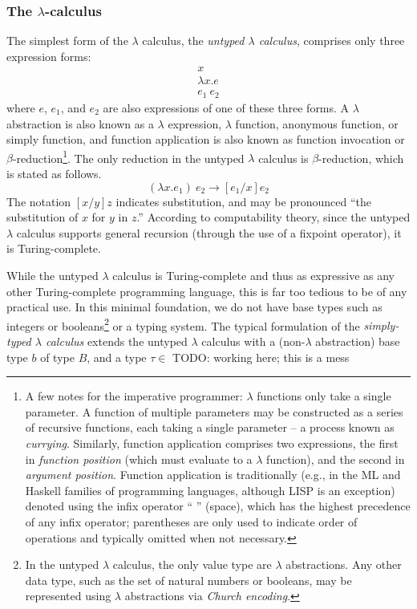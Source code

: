 
\subsubsection{The $\lambda$-calculus}
\label{sec:lambda-calculus}


The simplest form of the $\lambda$ calculus, the \textit{untyped $\lambda$ calculus}, comprises only three expression forms:
\begin{align}
  \label{eq:untyped-lambda-calculus}
  x\tag{Variable} \\
  \lambda x.e\tag{$\lambda$ abstraction} \\
  e_1\ e_2\tag{Function application}
\end{align}
where $e$, $e_1$, and $e_2$ are also expressions of one of these three forms. A $\lambda$ abstraction is also known as a $\lambda$ expression, $\lambda$ function, anonymous function, or simply function, and function application is also known as function invocation or $\beta$-reduction\footnote{A few notes for the imperative programmer: $\lambda$ functions only take a single parameter. A function of multiple parameters may be constructed as a series of recursive functions, each taking a single parameter -- a process known as \textit{currying}. Similarly, function application comprises two expressions, the first in \textit{function position} (which must evaluate to a $\lambda$ function), and the second in \textit{argument position}. Function application is traditionally (e.g., in the ML and Haskell families of programming languages, although LISP is an exception) denoted using the infix operator `` '' (space), which has the highest precedence of any infix operator; parentheses are only used to indicate order of operations and typically omitted when not necessary.}. The only reduction in the untyped $\lambda$ calculus is $\beta$-reduction, which is stated as follows.\[(\lambda x.e_1)\ e_2\to [e_1/x]e_2\] The notation $[x/y]z$ indicates substitution, and may be pronounced ``the substitution of $x$ for $y$ in $z$.'' According to computability theory, since the untyped $\lambda$ calculus supports general recursion (through the use of a fixpoint operator), it is Turing-complete.

While the untyped $\lambda$ calculus is Turing-complete and thus as expressive as any other Turing-complete programming language, this is far too tedious to be of any practical use. In this minimal foundation, we do not have base types such as integers or booleans\footnote{In the untyped $\lambda$ calculus, the only value type are $\lambda$ abstractions. Any other data type, such as the set of natural numbers or booleans, may be represented using $\lambda$ abstractions via \textit{Church encoding}.} or a typing system. The typical formulation of the \textit{simply-typed $\lambda$ calculus} extends the untyped $\lambda$ calculus with a (non-$\lambda$ abstraction) base type $b$ of type $B$, and a type $\tau\in $ TODO: working here; this is a mess

